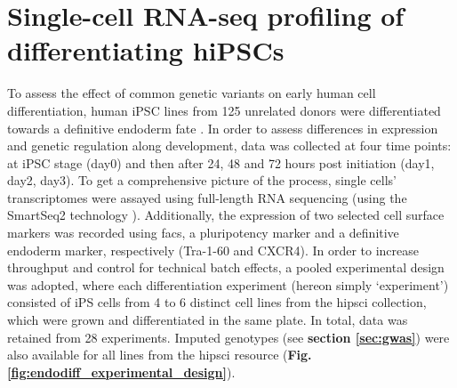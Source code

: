 
\newpage

\section{Single-cell RNA-seq profiling of differentiating hiPSCs}
\label{sec:endodiff_summary}

To assess the effect of common genetic variants on early human cell differentiation, human iPSC lines from 125 unrelated donors were differentiated towards a definitive endoderm fate \cite{hannan2013production}.
In order to assess differences in expression and genetic regulation along development, data was collected at four 
time points: at iPSC stage (day0) and then after 24, 48 and 72 hours post initiation (day1, day2, day3).
To get a comprehensive picture of the process, single cells' transcriptomes were assayed using full-length RNA sequencing (using the SmartSeq2 technology \cite{picelli2013smart}).
Additionally, the expression of two selected cell surface markers was recorded using \gls{facs}, a pluripotency marker and a definitive endoderm marker, respectively (Tra-1-60 and CXCR4).
In order to increase throughput and control for technical batch effects, 
a pooled experimental design
was adopted, where each differentiation experiment (hereon simply `experiment') consisted of iPS cells from 4 to 6 distinct cell lines from the \gls{hipsci} collection, which were grown and differentiated in the same plate.
In total, data was retained from 28 experiments.
Imputed genotypes (see \textbf{section \ref{sec:gwas}}) were also available for all lines from the \gls{hipsci} resource (\textbf{Fig. \ref{fig:endodiff_experimental_design}}).

